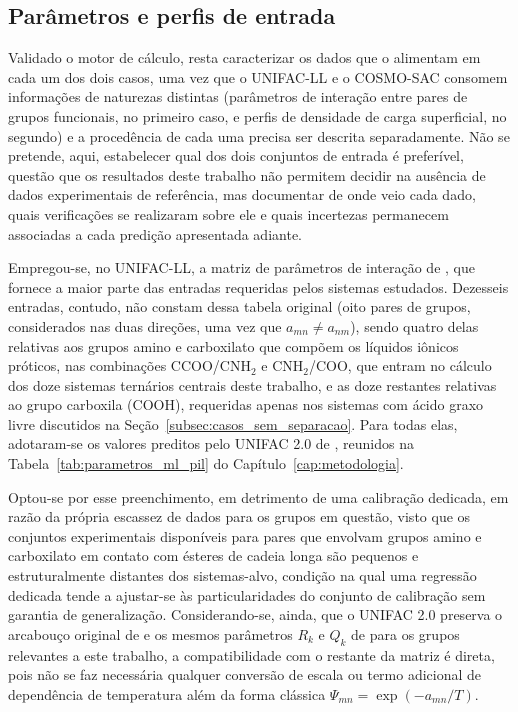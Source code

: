\subsection{Parâmetros e perfis de entrada}
\label{subsec:parametros_perfis}

Validado o motor de cálculo, resta caracterizar os dados que o alimentam em cada um dos dois casos, uma vez que o UNIFAC-LL e o COSMO-SAC consomem informações de naturezas distintas (parâmetros de interação entre pares de grupos funcionais, no primeiro caso, e perfis de densidade de carga superficial, no segundo) e a procedência de cada uma precisa ser descrita separadamente. Não se pretende, aqui, estabelecer qual dos dois conjuntos de entrada é preferível, questão que os resultados deste trabalho não permitem decidir na ausência de dados experimentais de referência, mas documentar de onde veio cada dado, quais verificações se realizaram sobre ele e quais incertezas permanecem associadas a cada predição apresentada adiante.

Empregou-se, no UNIFAC-LL, a matriz de parâmetros de interação de , que fornece a maior parte das entradas requeridas pelos sistemas estudados. Dezesseis entradas, contudo, não constam dessa tabela original (oito pares de grupos, considerados nas duas direções, uma vez que $a_{mn} \neq a_{nm}$), sendo quatro delas relativas aos grupos amino e carboxilato que compõem os líquidos iônicos próticos, nas combinações CCOO/CNH$_2$ e CNH$_2$/COO, que entram no cálculo dos doze sistemas ternários centrais deste trabalho, e as doze restantes relativas ao grupo carboxila (COOH), requeridas apenas nos sistemas com ácido graxo livre discutidos na Seção~\ref{subsec:casos_sem_separacao}. Para todas elas, adotaram-se os valores preditos pelo UNIFAC 2.0 de , reunidos na Tabela~\ref{tab:parametros_ml_pil} do Capítulo~\ref{cap:metodologia}.

Optou-se por esse preenchimento, em detrimento de uma calibração dedicada, em razão da própria escassez de dados para os grupos em questão, visto que os conjuntos experimentais disponíveis para pares que envolvam grupos amino e carboxilato em contato com ésteres de cadeia longa são pequenos e estruturalmente distantes dos sistemas-alvo, condição na qual uma regressão dedicada tende a ajustar-se às particularidades do conjunto de calibração sem garantia de generalização. Considerando-se, ainda, que o UNIFAC 2.0 preserva o arcabouço original de  e os mesmos parâmetros $R_k$ e $Q_k$ de  para os grupos relevantes a este trabalho, a compatibilidade com o restante da matriz é direta, pois não se faz necessária qualquer conversão de escala ou termo adicional de dependência de temperatura além da forma clássica $\Psi_{mn} = \exp(-a_{mn}/T)$.

